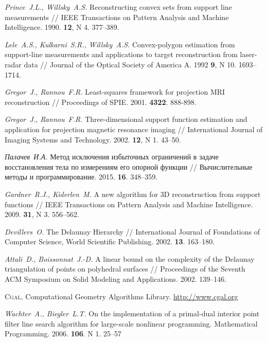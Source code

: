 \documentclass[a4paper, 10pt]{article}
\theoremstyle{definition}
\theoremstyle{plain}
\theoremstyle{plain}
\begin{document}
\begin{thebibliography}{50}

\emph{Prince~J.L., Willsky~A.S.}
Reconstructing convex sets from support line measurements //
IEEE Transactions on Pattern Analysis and Machine Intelligence.
1990.
\textbf{12},
N 4.
377--389.

\emph{Lele~A.S., Kulkarni~S.R., Willsky~A.S.}
Convex-polygon estimation from support-line measurements and applications to
target reconstruction from laser-radar data //
Journal of the Optical Society of America A.
1992
\textbf{9},
N 10.
1693--1714.

\emph{Gregor~J., Rannou~F.R.}
Least-squares framework for projection {MRI} reconstruction //
Proceedings of SPIE.
2001.
\textbf{4322}.
888-898.

\emph{Gregor~J., Rannou~F.R.}
Three-dimensional support function estimation and application for projection
magnetic resonance imaging //
International Journal of Imaging Systems and Technology.
2002.
\textbf{12},
N 1.
43--50.

\emph{Палачев~И.А.}
Метод исключения избыточных ограничений в задаче восстановления тела по
измерениям его опорной функции //
Вычислительные методы и программирование.
2015.
\textbf{16}.
348--359.

\emph{Gardner~R.J., Kiderlen~M.}
A new algorithm for 3D reconstruction from support functions //
IEEE Transactions on Pattern Analysis and Machine Intelligence.
2009.
\textbf{31},
N 3.
556--562.

\emph{Devillers~O.}
The Delaunay Hierarchy //
International Journal of Foundations of Computer Science,
World Scientific Publishing.
2002.
\textbf{13}.
163--180.

\emph{Attali~D., Boissonnat~J.-D.}
A linear bound on the complexity of the Delaunay triangulation of points on
polyhedral surfaces //
Proceedings of the Seventh ACM Symposium on Solid Modeling and Applications.
2002.
139--146.

\textsc{Cgal}, {C}omputational {G}eometry {A}lgorithms {L}ibrary.
\url{http://www.cgal.org}

\emph{Wachter~A., Biegler~L.T.}
On the implementation of a primal-dual interior point filter line search
algorithm for large-scale nonlinear programming.
Mathematical Programming.
2006.
\textbf{106}.
N 1.
25--57

\end{thebibliography}
\end{document}
